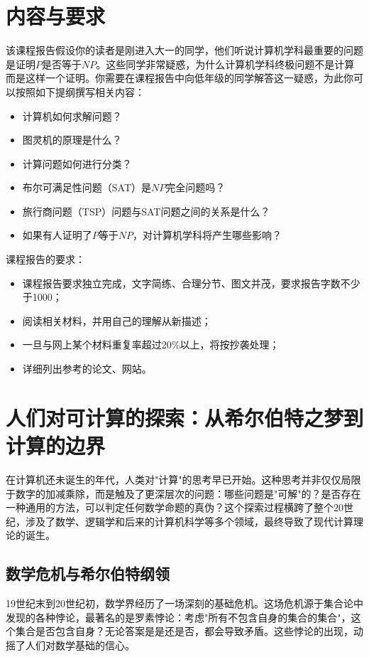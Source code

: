 \documentclass[a4paper,12pt]{ctexart}
\begin{document}
\maketitle
\newpage


\section{内容与要求}
该课程报告假设你的读者是刚进入大一的同学，他们听说计算机学科最重要的问题是证明$P$是否等于$NP$。这些同学非常疑惑，为什么计算机学科终极问题不是计算而是这样一个证明。你需要在课程报告中向低年级的同学解答这一疑惑，为此你可以按照如下提纲撰写相关内容：
\begin{itemize}
    \item 计算机如何求解问题？
    \item 图灵机的原理是什么？
    \item 计算问题如何进行分类？
    \item 布尔可满足性问题（SAT）是$NP$完全问题吗？
    \item 旅行商问题（TSP）问题与SAT问题之间的关系是什么？
    \item 如果有人证明了$P$等于$NP$，对计算机学科将产生哪些影响？
\end{itemize}

课程报告的要求：
\begin{itemize}
    \item 课程报告要求独立完成，文字简练、合理分节、图文并茂，要求报告字数不少于1000；
    \item 阅读相关材料，并用自己的理解从新描述；
    \item 一旦与网上某个材料重复率超过20\%以上，将按抄袭处理；
    \item 详细列出参考的论文、网站。
\end{itemize}

\section{人们对可计算的探索：从希尔伯特之梦到计算的边界}
在计算机还未诞生的年代，人类对"计算"的思考早已开始。这种思考并非仅仅局限于数字的加减乘除，而是触及了更深层次的问题：哪些问题是"可解"的？是否存在一种通用的方法，可以判定任何数学命题的真伪？这个探索过程横跨了整个20世纪，涉及了数学、逻辑学和后来的计算机科学等多个领域，最终导致了现代计算理论的诞生。

\subsection{数学危机与希尔伯特纲领}
19世纪末到20世纪初，数学界经历了一场深刻的基础危机。这场危机源于集合论中发现的各种悖论，最著名的是罗素悖论：考虑"所有不包含自身的集合的集合"，这个集合是否包含自身？无论答案是是还是否，都会导致矛盾。这些悖论的出现，动摇了人们对数学基础的信心。
\end{document}
